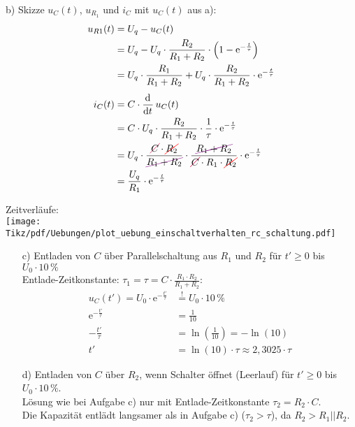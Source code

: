{\begin{minipage}[t]{0.48\textwidth}
    b) %
    Skizze $u_C(t)$, $u_{R_1}$ und $i_C$ mit $u_C(t)$ aus a):
    \begin{align*}
        u_{R1}(t) &= U_q - u_C(t) \\
            &= U_q - U_q \cdot \frac{R_2}{R_1+R_2} \cdot \left( 1 - \mathrm{e}^{-\frac{t}{\tau}} \right) \\
            &= U_q \cdot \frac{R_1}{R_1+R_2} + U_q \cdot \frac{R_2}{R_1+R_2} \cdot \mathrm{e}^{-\frac{t}{\tau}} \\[4pt]
        i_C(t) &= C \cdot \dt\, u_C(t) \\
            &= C \cdot U_q \cdot \frac{R_2}{R_1+R_2} \cdot \frac{1}{\tau} \cdot \mathrm{e}^{-\frac{t}{\tau}} \\
            &= U_q \cdot \frac{\colorcancel{C}{purple} \cdot \redcancel{R_2}}{\colorcancel{R_1+R_2}{violet}} \cdot \frac{\colorcancel{R_1+R_2}{violet}}{\colorcancel{C}{purple} \cdot R_1 \cdot \redcancel{R_2}}  \cdot \mathrm{e}^{-\frac{t}{\tau}}\\
            &= \frac{U_q}{R_1} \cdot \mathrm{e}^{-\frac{t}{\tau}}
    \end{align*}
\end{minipage}%
\begin{minipage}[t]{0.48\textwidth}\centering
    Zeitverläufe:\\
    \texttt{[image: Tikz/pdf/Uebungen/plot\_uebung\_einschaltverhalten\_rc\_schaltung.pdf]}%
\end{minipage}
\begin{itemize}
\item[c)] Entladen von $C$ über Parallelschaltung aus $R_1$ und $R_2$ für $t'\geq0$ bis $U_0 \cdot 10\,\%$ \\
Entlade-Zeitkonstante: $\tau_1= \tau = C \cdot \frac{R_1 \cdot R_2}{R_1+R_2}$:
\begin{align*}
    u_C(t') = U_0 \cdot \mathrm{e}^{-\frac{t'}{\tau}} &\overset{!}{=} U_0 \cdot 10\,\% \\
    \mathrm{e}^{-\frac{t'}{\tau}} &= \frac{1}{10} \\
    -\frac{t'}{\tau} &= \ln\left(\frac{1}{10}\right) = -\ln\left(10\right) \\
    t' &= \ln\left(10\right) \cdot \tau \approx 2,3025 \cdot \tau
\end{align*}
\item[d)] Entladen von $C$ über $R_2$, wenn Schalter öffnet (Leerlauf) für $t'\geq0$ bis $U_0 \cdot 10\,\%$.\\
Lösung wie bei Aufgabe c) nur mit Entlade-Zeitkonstante $\tau_2 = R_2 \cdot C$. \\
Die Kapazität entlädt langsamer als in Aufgabe c) ($\tau_2 > \tau$), da $R_2 > R_1||R_2$.
\end{itemize}
}

